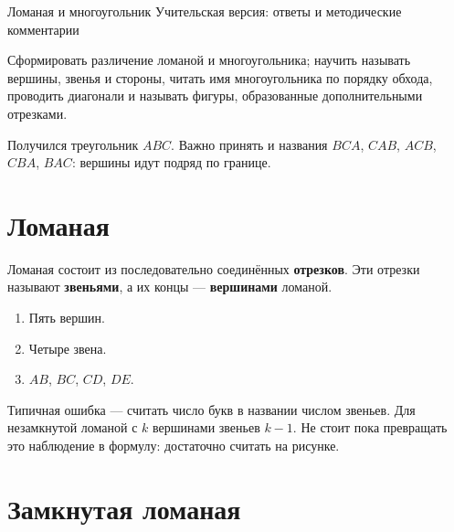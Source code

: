 
\worksheettitle
  {Ломаная и многоугольник}
  {Учительская версия: ответы и методические комментарии}

\begin{teacherbox}
  Сформировать различение ломаной и многоугольника; научить называть вершины,
  звенья и стороны, читать имя многоугольника по порядку обхода, проводить
  диагонали и называть фигуры, образованные дополнительными отрезками.
\end{teacherbox}

\begin{checkpointbox}
  Получился треугольник \(ABC\). Важно принять и названия \(BCA\), \(CAB\),
  \(ACB\), \(CBA\), \(BAC\): вершины идут подряд по границе.
\end{checkpointbox}

\section{Ломаная}

\openbrokenfigure

\begin{propertybox}
  Ломаная состоит из последовательно соединённых \textbf{отрезков}. Эти
  отрезки называют \textbf{звеньями}, а их концы --- \textbf{вершинами}
  ломаной.
\end{propertybox}

\begin{practicebox}
  \begin{enumerate}[label=\alph*),itemsep=0.4em]
    \item Пять вершин.
    \item Четыре звена.
    \item \(AB\), \(BC\), \(CD\), \(DE\).
  \end{enumerate}
\end{practicebox}

\begin{teacherbox}
  Типичная ошибка --- считать число букв в названии числом звеньев. Для
  незамкнутой ломаной с \(k\) вершинами звеньев \(k-1\). Не стоит пока
  превращать это наблюдение в формулу: достаточно считать на рисунке.
\end{teacherbox}

\section{Замкнутая ломаная}

